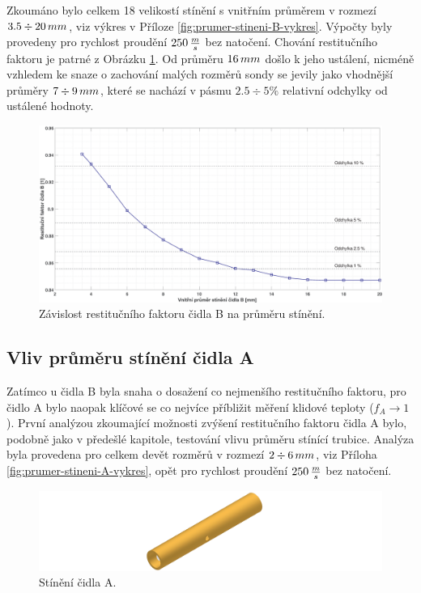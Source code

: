         Zkoumáno bylo celkem 18 velikostí stínění s vnitřním průměrem v rozmezí \linebreak$3.5 \div 20\, mm$, viz výkres v Příloze \ref{fig:prumer-stineni-B-vykres}. Výpočty byly provedeny pro rychlost proudění $250 \, \frac{m}{s}$ bez natočení. Chování restitučního faktoru je patrné z Obrázku \ref{fig:prumer-stineni-B}. Od průměru $16 \, mm$ došlo k jeho ustálení, nicméně vzhledem ke snaze o zachování malých rozměrů sondy se jevily jako vhodnější průměry $7 \div 9 \, mm$, které se nachází v pásmu $2.5 \div 5 \%$ relativní odchylky od ustálené hodnoty.
        
        \begin{figure}[ht!]
            \centering
            \includegraphics*[width=\textwidth]{400_SIMULACE_KONSTRUKCNICH_UPRAV/Grafy/04_prumer_stineni_B}
            \caption{Závislost restitučního faktoru čidla B na průměru stínění.}
            \label{fig:prumer-stineni-B}
        \end{figure}
    
    \newpage
    \subsection{Vliv průměru stínění čidla A} \label{sec:stineni-A}
        Zatímco u čidla B byla snaha o dosažení co nejmenšího restitučního faktoru, pro čidlo A bylo naopak klíčové se co nejvíce příbližit měření klidové teploty ($f_A \rightarrow 1$). První analýzou zkoumající možnosti zvýšení restitučního faktoru čidla A bylo, podobně jako v předešlé kapitole, testování vlivu průměru stínící trubice. Analýza byla provedena pro celkem devět rozměrů v rozmezí $2 \div 6 \, mm$, viz Příloha \ref{fig:prumer-stineni-A-vykres}, opět pro rychlost proudění $250 \, \frac{m}{s}$ bez natočení.
        
        \begin{figure}[ht!]
            \centering
            \includegraphics[width=\textwidth]{400_SIMULACE_KONSTRUKCNICH_UPRAV/Vykresy_rendery/Stineni_A.png}
            \caption{Stínění čidla A.}
            \label{fig:stineni-A}
        \end{figure}

